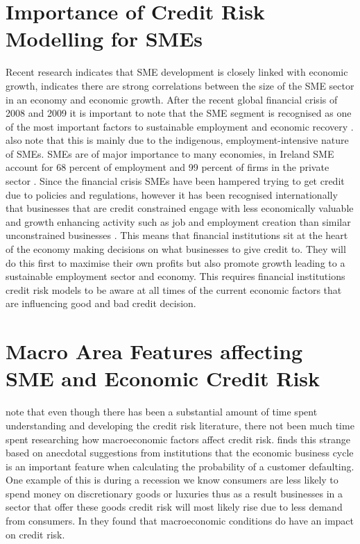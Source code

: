 \section{Importance of Credit Risk Modelling for SMEs}
Recent research indicates that SME development is closely linked with economic growth, \cite{beck_smes_2005} indicates there are strong correlations between the size of the SME sector in an economy and economic growth. After the recent global financial crisis of 2008 and 2009 it is important to note that the SME segment is recognised as one of the most important factors to sustainable employment and economic recovery \citep{lawless_smes_2012}. \cite{lawless_smes_2012} also note that this is mainly due to the indigenous, employment-intensive nature of SMEs. SMEs are of major importance to many economies, in Ireland SME account for 68 percent of employment and 99 percent of firms in the private sector \citep{lawless_irish_2012}. Since the financial crisis SMEs have been hampered trying to get credit due to policies and regulations, however it has been recognised internationally that businesses that are credit constrained engage with less economically valuable and growth enhancing activity such as job and employment creation than similar unconstrained businesses \citep{campello_real_2010}. This means that financial institutions sit at the heart of the economy making decisions on what businesses to give credit to. They will do this first to maximise their own profits but also promote growth leading to a sustainable employment sector and economy. This requires financial institutions credit risk models to be aware at all times of the current economic factors that are influencing good and bad credit decision. 

\section{Macro Area Features affecting SME and Economic Credit Risk}
\cite{hackbarth_capital_2006} note that even though there has been a substantial amount of time spent understanding and developing the credit risk literature, there not been much time spent researching how macroeconomic factors affect credit risk.  \cite{hackbarth_capital_2006} finds this strange based on anecdotal suggestions from institutions that the economic business cycle is an important feature when calculating the probability of a customer defaulting. One example of this is during a recession we know consumers are less likely to spend money on discretionary goods or luxuries thus as a result businesses in a sector that offer these goods credit risk will most likely rise due to less demand from consumers. In \cite{hackbarth_capital_2006} they found that macroeconomic conditions do have an impact on credit risk.

